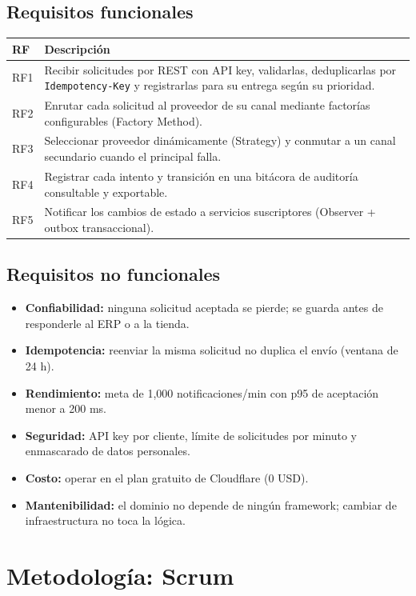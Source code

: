 \documentclass[11pt,a4paper]{article}
\begin{document}
\subsection{Requisitos funcionales}
\begin{tabularx}{\textwidth}{@{}lX@{}}
\toprule
\textbf{RF} & \textbf{Descripción} \\
\midrule
RF1 & Recibir solicitudes por REST con API key, validarlas, deduplicarlas por \texttt{Idempotency-Key} y registrarlas para su entrega según su prioridad. \\
RF2 & Enrutar cada solicitud al proveedor de su canal mediante factorías configurables (Factory Method). \\
RF3 & Seleccionar proveedor dinámicamente (Strategy) y conmutar a un canal secundario cuando el principal falla. \\
RF4 & Registrar cada intento y transición en una bitácora de auditoría consultable y exportable. \\
RF5 & Notificar los cambios de estado a servicios suscriptores (Observer + outbox transaccional). \\
\bottomrule
\end{tabularx}

\subsection{Requisitos no funcionales}
\begin{itemize}
  \item \textbf{Confiabilidad:} ninguna solicitud aceptada se pierde; se guarda antes de responderle al ERP o a la tienda.
  \item \textbf{Idempotencia:} reenviar la misma solicitud no duplica el envío (ventana de 24 h).
  \item \textbf{Rendimiento:} meta de 1,000 notificaciones/min con p95 de aceptación menor a 200 ms.
  \item \textbf{Seguridad:} API key por cliente, límite de solicitudes por minuto y enmascarado de datos personales.
  \item \textbf{Costo:} operar en el plan gratuito de Cloudflare (0 USD).
  \item \textbf{Mantenibilidad:} el dominio no depende de ningún framework; cambiar de infraestructura no toca la lógica.
\end{itemize}

\section{Metodología: Scrum}
\end{document}
